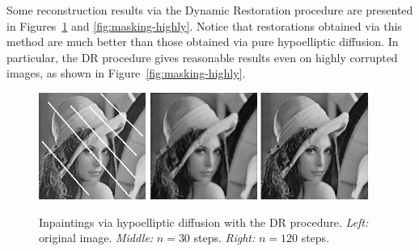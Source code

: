 \documentclass[proc]{edpsmath}
\begin{document}
Some reconstruction results via the Dynamic Restoration procedure are presented in Figures~\ref{fig:masking} and \ref{fig:masking-highly}. Notice that restorations obtained via this method are much better than those obtained via pure hypoelliptic diffusion. In particular, the DR procedure gives reasonable results even on highly corrupted images, as shown in Figure~\ref{fig:masking-highly}.

\begin{figure}
  \includegraphics[height=3.5cm]{imgs/lena-diag}\qquad
  \includegraphics[height = 3.5cm]{imgs/lena-masking-30}\qquad
  \includegraphics[height = 3.5cm]{imgs/lena-masking-120}
  \caption{Inpaintings via {hypoelliptic diffusion with} the DR procedure.
  \emph{Left: }original image. \emph{Middle:}  $n=30$ steps. \emph{Right: }$n=120$ steps.}
  \label{fig:masking}
\end{figure}
\end{document}
